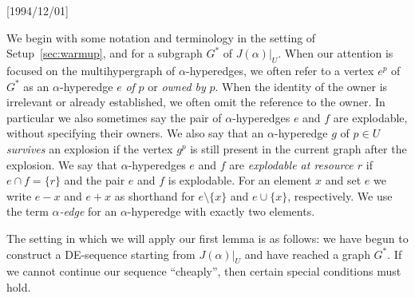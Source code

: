 \NeedsTeXFormat{LaTeX2e}[1994/12/01]\documentclass[letterpaper, 11pt]{article}
\theoremstyle{definition}
\theoremstyle{remark}
\numberwithin{equation}{section}
\begin{document}
We begin with some notation and terminology in the setting of
Setup~\ref{sec:warmup}, and for a subgraph  $G^*$ of $J(\alpha)|_U$.
When our attention is focused on the multihypergraph of
$\alpha$-hyperedges, we often refer to a vertex $e^p$ of $G^*$ as an
$\alpha$-hyperedge $e$ {\em of} $p$ or {\em owned by} $p$. When the identity of
the owner is irrelevant or already established, we often omit the
reference to the owner. In particular we also sometimes say the pair
of $\alpha$-hyperedges $e$ and $f$ are explodable, without specifying
their owners.
We also say that an $\alpha$-hyperedge $g$ of $p\in U$ {\em survives} an
explosion if the vertex $g^p$ is still present in the current graph
after the explosion. 
We say that $\alpha$-hyperedges $e$ and $f$ are {\em explodable at resource
$r$} if $e\cap f = \{ r \}$ and the pair $e$ and $f$ is explodable. 
For an element $x$ and set $e$ we write $e-x$ and
$e+x$ as shorthand for $e\setminus\{x\}$ and $e\cup\{x\}$, respectively.
We use the term {\it $\alpha$-edge} for an $\alpha$-hyperedge with
exactly two elements.

The setting in which we will apply our first lemma is as
  follows: we have begun to construct a DE-sequence starting from
  $J(\alpha)|_U$ and have reached a graph $G^*$. If we cannot continue
  our sequence ``cheaply'', then certain special conditions must hold.
\end{document}
